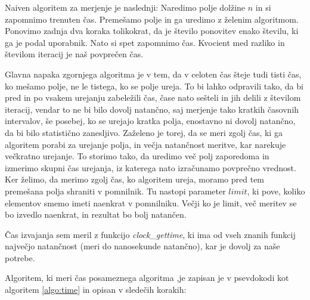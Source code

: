 \documentclass[a4paper,oneside,12pt]{article}
\begin{document}
Naiven algoritem za merjenje je naslednji:                                 
Naredimo polje dolžine $n$ in si zapomnimo trenuten čas. Premešamo polje in ga
uredimo z želenim algoritmom. Ponovimo zadnja dva koraka tolikokrat, da je število
ponovitev enako številu, ki ga je podal uporabnik. Nato si spet zapomnimo čas. Kvocient
med razliko in številom iteracij je naš povprečen čas.

Glavna napaka zgornjega algoritma je v tem, da v celoten čas šteje tudi tisti čas, ko
mešamo polje, ne le tistega, ko se polje ureja. To bi lahko odpravili tako, da bi pred
in po vsakem urejanju zabeležili čas, čase nato sešteli in jih delili z številom iteracij,
vendar to ne bi bilo dovolj natančno, saj merjenje tako kratkih časovnih intervalov,
še posebej, ko se urejajo kratka polja, enostavno ni dovolj natančno, da bi bilo
statistično zanesljivo. Zaželeno je torej, da se meri zgolj čas, ki ga algoritem porabi za
urejanje polja, in večja natančnost meritve, kar narekuje večkratno urejanje. To storimo
tako, da uredimo več polj zaporedoma in izmerimo skupni čas urejanja, iz katerega nato
izračunamo povprečno
vrednost. Ker želimo, da merimo zgolj čas, ko algoritem ureja, moramo pred tem 
premešana polja shraniti v pomnilnik. Tu nastopi parameter $limit$, ki pove, koliko
elementov smemo imeti naenkrat v pomnilniku. Večji ko je limit, več meritev se bo izvedlo naenkrat,
in rezultat bo bolj natančen.

Čas izvajanja sem meril z funkcijo \emph{clock\_gettime}, ki ima od vseh znanih
funkcij največjo natančnost (meri do nanosekunde natančno), kar je dovolj
za naše potrebe.

Algoritem, ki meri čas posameznega algoritma ,je zapisan je v psevdokodi kot
algoritem \ref{algo:time} in opisan v sledečih korakih:
\end{document}
